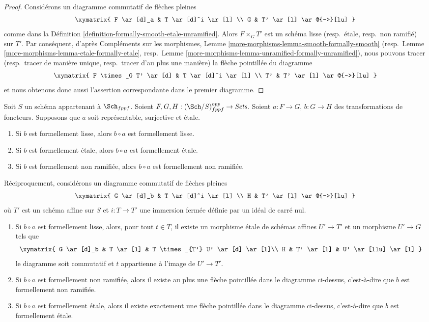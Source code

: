 \begin{proof}
Considérons un diagramme commutatif de flèches pleines
$$
\xymatrix{
F \ar[d]_a & T \ar[d]^i \ar[l] \\
G & T' \ar[l] \ar@{-->}[lu]
}
$$
comme dans la
Définition \ref{definition-formally-smooth-etale-unramified}.
Alors $F \times_G T'$ est un schéma lisse (resp.\ étale, resp.\ non ramifié)
sur $T'$. Par conséquent, d'après
Compléments sur les morphismes, Lemme \ref{more-morphisms-lemma-smooth-formally-smooth}
(resp.\ Lemme \ref{more-morphisms-lemma-etale-formally-etale},
resp.\ Lemme \ref{more-morphisms-lemma-unramified-formally-unramified}),
nous pouvons tracer (resp.\ tracer de manière unique, resp.\ tracer d'au plus
une manière) la flèche pointillée du diagramme
$$
\xymatrix{
F \times_G T' \ar[d] & T \ar[d]^i \ar[l] \\
T' & T' \ar[l] \ar@{-->}[lu]
}
$$
et nous obtenons donc aussi l'assertion correspondante dans le premier diagramme.
\end{proof}

\begin{lemma}
\label{lemma-etale-on-top}
Soit $S$ un schéma appartenant à $\Sch_{fppf}$.
Soient $F, G, H : (\Sch/S)_{fppf}^{opp} \to \textit{Sets}$.
Soient $a : F \to G$, $b : G \to H$ des transformations de foncteurs.
Supposons que $a$ soit représentable, surjective et étale.
\begin{enumerate}
\item Si $b$ est formellement lisse, alors $b \circ a$ est formellement lisse.
\item Si $b$ est formellement étale, alors $b \circ a$ est formellement étale.
\item Si $b$ est formellement non ramifiée, alors $b \circ a$ est formellement non ramifiée.
\end{enumerate}
Réciproquement, considérons un diagramme commutatif de flèches pleines
$$
\xymatrix{
G \ar[d]_b & T \ar[d]^i \ar[l] \\
H & T' \ar[l] \ar@{-->}[lu]
}
$$
où $T'$ est un schéma affine sur $S$
et $i : T \to T'$ une immersion fermée définie par un idéal de carré nul.
\begin{enumerate}
\item[(4)] Si $b \circ a$ est formellement lisse, alors, pour tout $t \in T$,
il existe un morphisme étale de schémas affines $U' \to T'$ et un morphisme
$U' \to G$ tels que
$$
\xymatrix{
G \ar[d]_b & T \ar[l] & T \times_{T'} U' \ar[d] \ar[l]\\
H & T' \ar[l] & U' \ar[llu] \ar[l]
}
$$
le diagramme soit commutatif et $t$ appartienne à l'image de $U' \to T'$.
\item[(5)] Si $b \circ a$ est formellement non ramifiée, alors il existe au plus
une flèche pointillée dans le diagramme ci-dessus, c'est-à-dire que $b$ est formellement non ramifiée.
\item[(6)] Si $b \circ a$ est formellement étale, alors il existe exactement une
flèche pointillée dans le diagramme ci-dessus, c'est-à-dire que $b$ est formellement étale.
\end{enumerate}
\end{lemma}

